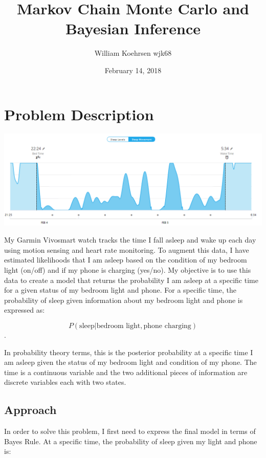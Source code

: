 \documentclass[12pt]{article}
\title{Markov Chain Monte Carlo and Bayesian Inference}
\author{William Koehrsen wjk68}
\date{February 14, 2018}
\makeatletter
\def\maxwidth{\ifdim\Gin@nat@width>\linewidth\linewidth
    \else\Gin@nat@width\fi}
\let\Oldincludegraphics\includegraphics
\renewcommand{\includegraphics}[1]{\Oldincludegraphics[width=.8\maxwidth]{#1}}
\makeatother
\begin{document}
    
    
    \maketitle
    \tableofcontents
    

\hypertarget{problem-description}{%
\section{Problem Description}\label{problem-description}}

\includegraphics{images/sleep_data_graph.PNG}

My Garmin Vivosmart watch tracks the time I fall asleep and wake up each
day using motion sensing and heart rate monitoring. To augment this
data, I have estimated likelihoods that I am asleep based on the
condition of my bedroom light (on/off) and if my phone is charging
(yes/no). My objective is to use this data to create a model that
returns the probability I am asleep at a specific time for a given
status of my bedroom light and phone. For a specific time, the
probability of sleep given information about my bedroom light and phone
is expressed as:

\[P(\text{sleep} | \text{bedroom light}, \text{phone charging})\].

In probability theory terms, this is the posterior probability at a
specific time I am asleep given the status of my bedroom light and
condition of my phone. The time is a continuous variable and the two
additional pieces of information are discrete variables each with two
states.

    \hypertarget{approach}{%
\subsection{Approach}\label{approach}}

In order to solve this problem, I first need to express the final model
in terms of Bayes Rule. At a specific time, the probability of sleep
given my light and phone is:
\end{document}
